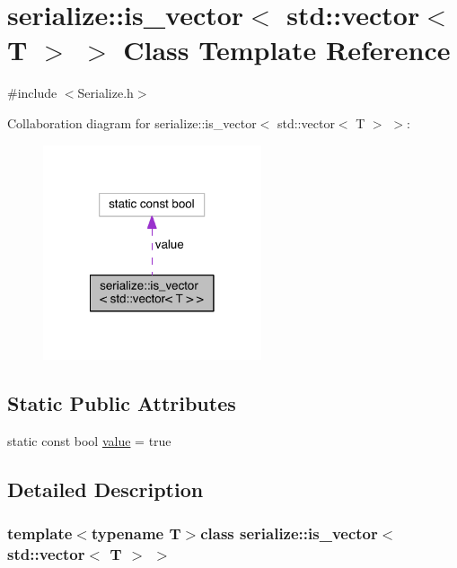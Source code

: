 \hypertarget{classserialize_1_1is__vector_3_01std_1_1vector_3_01_t_01_4_01_4}{}\section{serialize\+:\+:is\+\_\+vector$<$ std\+:\+:vector$<$ T $>$ $>$ Class Template Reference}
\label{classserialize_1_1is__vector_3_01std_1_1vector_3_01_t_01_4_01_4}


{\ttfamily \#include $<$Serialize.\+h$>$}



Collaboration diagram for serialize\+:\+:is\+\_\+vector$<$ std\+:\+:vector$<$ T $>$ $>$\+:
\nopagebreak
\begin{figure}[H]
\begin{center}
\leavevmode
\includegraphics[width=182pt]{classserialize_1_1is__vector_3_01std_1_1vector_3_01_t_01_4_01_4__coll__graph}
\end{center}
\end{figure}
\subsection*{Static Public Attributes}
\begin{DoxyCompactItemize}
\item 
static const bool \hyperlink{classserialize_1_1is__vector_3_01std_1_1vector_3_01_t_01_4_01_4_ab331b67d5bf759246c7998eb63d341ec}{value} = true
\end{DoxyCompactItemize}


\subsection{Detailed Description}
\subsubsection*{template$<$typename T$>$class serialize\+::is\+\_\+vector$<$ std\+::vector$<$ T $>$ $>$}



